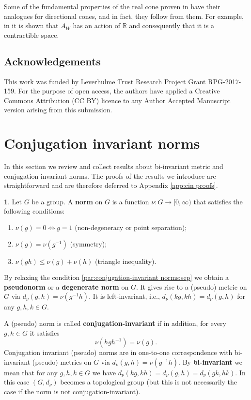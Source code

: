 \documentclass[12pt]{amsart}
\theoremstyle{definition}
\newtheorem{void}[prop]{}
\def\RR{\ensuremath{\mathbb{R}}}
\begin{document}
Some of the fundamental properties of the real cone proven in \cite{MR2866929} have their analogues for directional cones, and in fact, they follow from them.
For example, in \cite[Lemma 3.9 and 3.10]{MR2866929} it is shown that $A_W$ has an action of $\RR$ and consequently that it is a contractible space. 




\subsection*{Acknowledgements}
This work was funded by Leverhulme Trust Research Project Grant RPG-2017-159.
For the purpose of open access, the authors have applied a Creative Commons
Attribution (CC BY) licence to any Author Accepted Manuscript version
arising from this submission.







%
%
%

\section{Conjugation invariant norms}\label{sec:conjugation-invariant norms}


In this section we review and collect results about bi-invariant metric and conjugation-invariant norms.
The proofs of the results we introduce are straightforward and are therefore deferred to Appendix \ref{app:cin proofs}.


\begin{void}\label{par:conjugation-invariant norms}
Let $G$ be a group.
A {\bf norm} on $G$ is a function $\nu \colon G \to [0,\infty)$ that satisfies the following
conditions:
\begin{enumerate}[label=(\arabic*)]
\item\label{par:conjugation-invariant norms:sep}
$\nu(g)=0 \iff g=1$ \hfill(non-degeneracy or point separation);
\item\label{par:conjugation-invariant norms:sym}
$\nu(g)=\nu(g^{-1})$ \hfill (symmetry);
\item\label{par:conjugation-invariant norms:triangle}
$\nu(gh) \leq \nu(g)+\nu(h)$ \hfill (triangle inequality).
\end{enumerate}
By relaxing the condition \ref{par:conjugation-invariant norms:sep} we obtain a {\bf pseudo\-norm} or a {\bf degenerate norm} on $G$.
It gives rise to a (pseudo) metric on $G$ via $d_{\nu}(g,h)=\nu(g^{-1}h)$.
It is left-invariant, i.e., $d_\nu(kg,kh)=d_\nu(g,h)$ for any $g,h,k \in G$.

A (pseudo) norm is called {\bf conjugation-invariant} if in addition, for every $g,h \in G$ it satisfies
\[
\nu(hgh^{-1})=\nu(g).
\]
Conjugation invariant (pseudo) norms are in one-to-one correspondence with bi-invariant (pseudo) metrics on $G$ via $d_{\nu}(g,h)=\nu(g^{-1}h)$.
By {\bf bi-invariant} we mean that for any $g,h,k \in G$ we have $d_\nu(kg,kh)=d_\nu(g,h)=d_\nu(gk,hk)$.
In this case $(G,d_\nu)$ becomes a topological group (but this is not necessarily the case if the norm is not conjugation-invariant).
\end{void}
\end{document}
